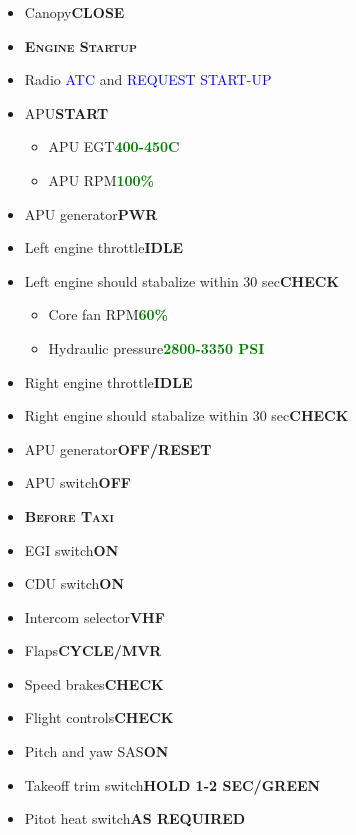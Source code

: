 \documentclass[a4paper,12pt,dvipsnames]{letter}
\newcommand{\radio}[1]{\textcolor{blue}{#1}}
\newcommand{\button}[1]{\textbf{#1}}
\newcommand{\degC}{\textdegree{}C}
\newcommand{\ok}[1]{\textcolor{Green}{\textbf{#1}}}
\newcommand{\myHead}[1]{{\LARGE\textsc{\textbf{#1}}}}
\begin{document}
{\begin{itemize}
 \item Canopy\dotfill\button{CLOSE}
\end{itemize}
\newpage
\begin{itemize}
 \item[] \myHead{Engine Startup}
 \item Radio \radio{ATC} and \radio{REQUEST START-UP}
 \item APU\dotfill\button{START}
  \begin{itemize}
  \item APU EGT\dotfill\ok{400-450\degC}
  \item APU RPM\dotfill\ok{100\;\%}
 \end{itemize}
 \item APU generator\dotfill\button{PWR}
 \item Left engine throttle\dotfill\button{IDLE}
 \item Left engine should stabalize within 30 sec\dotfill\button{CHECK}
  \begin{itemize}
  \item Core fan RPM\dotfill\ok{60\;\%}
  \item Hydraulic pressure\dotfill\ok{2800-3350 PSI}
 \end{itemize}
 \item Right engine throttle\dotfill\button{IDLE}
 \item Right engine should stabalize within 30 sec\dotfill\button{CHECK}
 \item APU generator\dotfill\button{OFF/RESET}
 \item APU switch\dotfill\button{OFF}
\end{itemize}
\newpage
\begin{itemize}
 \item[] \myHead{Before Taxi}
 \item EGI switch\dotfill\button{ON}
 \item CDU switch\dotfill\button{ON}
 \item Intercom selector\dotfill\button{VHF}
 \item Flaps\dotfill\button{CYCLE/MVR}
 \item Speed brakes\dotfill\button{CHECK}
 \item Flight controls\dotfill\button{CHECK}
 \item Pitch and yaw SAS\dotfill\button{ON}
 \item Takeoff trim switch\dotfill\button{HOLD 1-2 SEC/GREEN}
 \item Pitot heat switch\dotfill\button{AS REQUIRED}

\end{itemize}}
\end{document}
